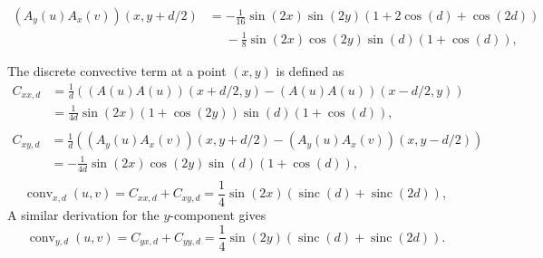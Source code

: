 \documentclass[preprint]{elsarticle}
\newcommand{\sinc}{\operatorname{sinc}}
\begin{document}
\begin{equation}
    \begin{split}
        (A_y(u) A_x(v))(x, y + d / 2)
        & = - \frac{1}{16} \sin(2 x) \sin(2 y) (1 + 2 \cos(d) + \cos(2 d)) \\
        & \phantom{=} - \frac{1}{8} \sin(2 x) \cos(2 y) \sin(d) (1 + \cos(d)),
    \end{split}
\end{equation}

The discrete convective term at a point $(x, y)$ is defined as
\begin{equation}
    \begin{split}
        C_{x x, d}
        & = \frac{1}{d} \left( (A(u) A(u))(x + d / 2, y) - (A(u) A(u))(x - d / 2, y) \right) \\
        & = \frac{1}{4 d} \sin(2 x) (1 + \cos(2 y)) \sin(d) (1 + \cos(d)) , \\
    \end{split}
\end{equation}
\begin{equation}
    \begin{split}
        C_{x y, d}
        & = \frac{1}{d} \left( (A_y(u) A_x(v))(x, y + d / 2) - (A_y(u) A_x(v))(x, y - d / 2) \right) \\
        & = - \frac{1}{4 d} \sin(2 x) \cos(2 y) \sin(d) (1 + \cos(d)), \\
    \end{split}
\end{equation}
\begin{equation}
    \operatorname{conv}_{x, d}(u, v) =
    C_{x x, d} + C_{x y, d} =
    \frac{1}{4} \sin(2 x) (\sinc(d) + \sinc(2 d)) ,
\end{equation}
A similar derivation for the $y$-component gives
\begin{equation}
    \operatorname{conv}_{y, d}(u, v) =
    C_{y x, d} + C_{y y, d} =
    \frac{1}{4} \sin(2 y) (\sinc(d) + \sinc(2 d)) .
\end{equation}
\end{document}
